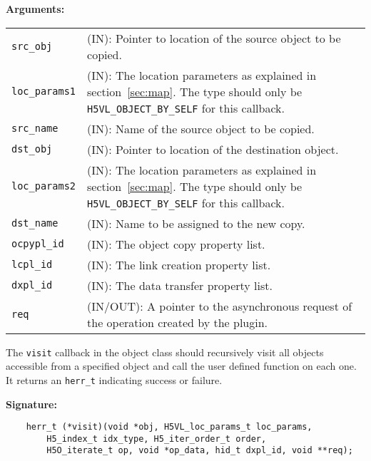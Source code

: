 \textbf{Arguments:}\\
\begin{tabular}{l p{10cm}}
  {\tt src\_obj} & (IN): Pointer to location of the source object to
  be copied.\\
  {\tt loc\_params1} & (IN): The location parameters as explained in
  section~\ref{sec:map}. The type should only be {\tt
    H5VL\_OBJECT\_BY\_SELF} for this callback.\\
  {\tt src\_name} & (IN): Name of the source object to
  be copied.\\
  {\tt dst\_obj} & (IN): Pointer to location of the destination
  object.\\
  {\tt loc\_params2} & (IN): The location parameters as explained in
  section~\ref{sec:map}. The type should only be {\tt
    H5VL\_OBJECT\_BY\_SELF} for this callback.\\
  {\tt dst\_name} & (IN): Name to be assigned to the new copy.\\
  {\tt ocpypl\_id} & (IN): The object copy property list.\\
  {\tt lcpl\_id} & (IN): The link creation property list.\\
  {\tt dxpl\_id} & (IN): The data transfer property list.\\
  {\tt req} & (IN/OUT): A pointer to the asynchronous request of the
  operation created by the plugin.\\
\end{tabular}


The {\tt visit} callback in the object class should recursively visit
all objects accessible from a specified object and call the
user defined function on each one. It returns an {\tt herr\_t}
indicating success or failure.

\textbf{Signature:}
\begin{lstlisting}
    herr_t (*visit)(void *obj, H5VL_loc_params_t loc_params, 
        H5_index_t idx_type, H5_iter_order_t order, 
        H5O_iterate_t op, void *op_data, hid_t dxpl_id, void **req);
\end{lstlisting}

